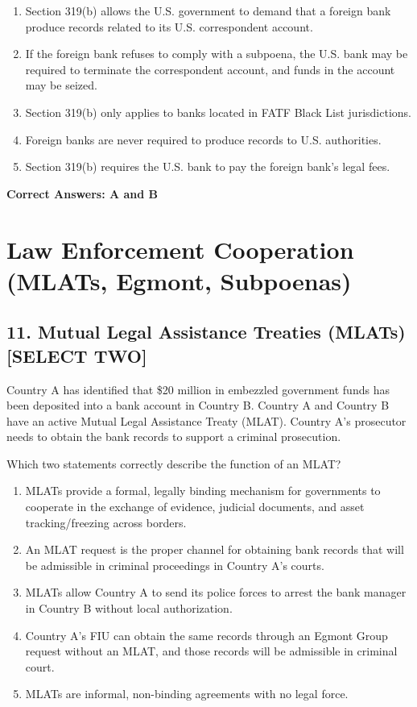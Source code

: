 \documentclass[11pt,a4paper]{article}
\begin{document}
	\begin{enumerate}[label=\Alph*.]
		\item Section 319(b) allows the U.S. government to demand that a foreign bank produce records related to its U.S. correspondent account.
		\item If the foreign bank refuses to comply with a subpoena, the U.S. bank may be required to terminate the correspondent account, and funds in the account may be seized.
		\item Section 319(b) only applies to banks located in FATF Black List jurisdictions.
		\item Foreign banks are never required to produce records to U.S. authorities.
		\item Section 319(b) requires the U.S. bank to pay the foreign bank's legal fees.
	\end{enumerate}
	
	\textbf{Correct Answers: A and B}
	
	\section{Law Enforcement Cooperation (MLATs, Egmont, Subpoenas)}
	
	\subsection{11. Mutual Legal Assistance Treaties (MLATs) \textnormal{[SELECT TWO]}}
	
	Country A has identified that \$20 million in embezzled government funds has been deposited into a bank account in Country B. Country A and Country B have an active Mutual Legal Assistance Treaty (MLAT). Country A's prosecutor needs to obtain the bank records to support a criminal prosecution.
	
	Which two statements correctly describe the function of an MLAT?
	
	\begin{enumerate}[label=\Alph*.]
		\item MLATs provide a formal, legally binding mechanism for governments to cooperate in the exchange of evidence, judicial documents, and asset tracking/freezing across borders.
		\item An MLAT request is the proper channel for obtaining bank records that will be admissible in criminal proceedings in Country A's courts.
		\item MLATs allow Country A to send its police forces to arrest the bank manager in Country B without local authorization.
		\item Country A's FIU can obtain the same records through an Egmont Group request without an MLAT, and those records will be admissible in criminal court.
		\item MLATs are informal, non-binding agreements with no legal force.
	\end{enumerate}
	
\end{document}
